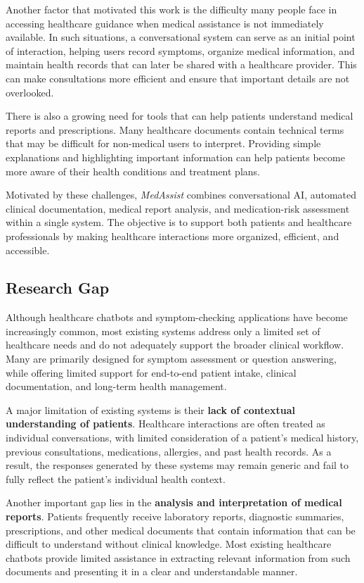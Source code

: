 \documentclass[conference]{IEEEtran}
\begin{document}
Another factor that motivated this work is the difficulty many people face in accessing healthcare guidance when medical assistance is not immediately available. In such situations, a conversational system can serve as an initial point of interaction, helping users record symptoms, organize medical information, and maintain health records that can later be shared with a healthcare provider. This can make consultations more efficient and ensure that important details are not overlooked.

There is also a growing need for tools that can help patients understand medical reports and prescriptions. Many healthcare documents contain technical terms that may be difficult for non-medical users to interpret. Providing simple explanations and highlighting important information can help patients become more aware of their health conditions and treatment plans.

Motivated by these challenges, \textit{MedAssist} combines conversational AI, automated clinical documentation, medical report analysis, and medication-risk assessment within a single system. The objective is to support both patients and healthcare professionals by making healthcare interactions more organized, efficient, and accessible.

\subsection{Research Gap}

Although healthcare chatbots and symptom-checking applications have become increasingly common, most existing systems address only a limited set of healthcare needs and do not adequately support the broader clinical workflow. Many are primarily designed for symptom assessment or question answering, while offering limited support for end-to-end patient intake, clinical documentation, and long-term health management.

A major limitation of existing systems is their \textbf{lack of contextual understanding of patients}. Healthcare interactions are often treated as individual conversations, with limited consideration of a patient's medical history, previous consultations, medications, allergies, and past health records. As a result, the responses generated by these systems may remain generic and fail to fully reflect the patient's individual health context.

Another important gap lies in the \textbf{analysis and interpretation of medical reports}. Patients frequently receive laboratory reports, diagnostic summaries, prescriptions, and other medical documents that contain information that can be difficult to understand without clinical knowledge. Most existing healthcare chatbots provide limited assistance in extracting relevant information from such documents and presenting it in a clear and understandable manner.
\end{document}
